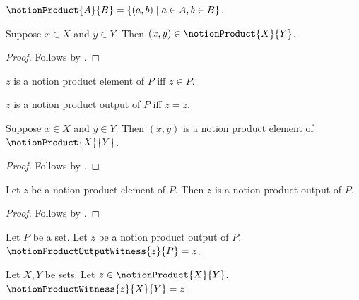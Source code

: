 

\begin{definition}\label{notion_product}
    $\notionProduct{A}{B}=\{(a,b)\mid a\in A, b\in B\}$.
\end{definition}

\begin{classification}\label{notion_product_intro}
    Suppose $x\in X$ and $y\in Y$.
    Then $(x,y)\in\notionProduct{X}{Y}$.
\end{classification}
\begin{proof}
    Follows by .
\end{proof}

\begin{definition}\label{notion_product_element}
    $z$ is a notion product element of $P$ iff $z\in P$.
\end{definition}

\begin{definition}\label{notion_product_output}
    $z$ is a notion product output of $P$ iff $z=z$.
\end{definition}

\begin{classification}\label{notion_product_element_intro}
    Suppose $x\in X$ and $y\in Y$.
    Then $(x,y)$ is a notion product element of
        $\notionProduct{X}{Y}$.
\end{classification}
\begin{proof}
    Follows by .
\end{proof}

\begin{classification}\label{notion_product_element_output}
    Let $z$ be a notion product element of $P$.
    Then $z$ is a notion product output of $P$.
\end{classification}
\begin{proof}
    Follows by .
\end{proof}

\begin{definition}\label{notion_product_output_witness}
    Let $P$ be a set.
    Let $z$ be a notion product output of $P$.
    $\notionProductOutputWitness{z}{P}=z$.
\end{definition}

\begin{definition}\label{notion_product_witness}
    Let $X,Y$ be sets.
    Let $z\in\notionProduct{X}{Y}$.
    $\notionProductWitness{z}{X}{Y}=z$.
\end{definition}

